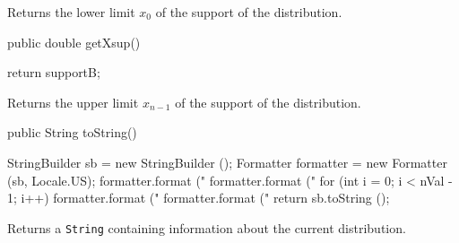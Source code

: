 \begin{tabb} Returns the lower limit $x_0$ of the support of the distribution.
\end{tabb}
\begin{htmlonly}
\end{htmlonly}
\begin{code}

   public double getXsup()\begin{hide} {
      return supportB;
   }\end{hide}
\end{code}
\begin{tabb} Returns the upper limit $x_{n-1}$ of the support of the distribution.
\end{tabb}
\begin{htmlonly}
\end{htmlonly}
\begin{code}

   public String toString()\begin{hide} {
      StringBuilder sb = new StringBuilder ();
      Formatter formatter = new Formatter (sb, Locale.US);
      formatter.format ("%
      formatter.format ("%
      for (int i = 0; i < nVal - 1; i++)
         formatter.format ("%
      formatter.format ("%
      return sb.toString ();
   }\end{hide}
\end{code}
\begin{tabb}
   Returns a \texttt{String} containing information about the current distribution.
\end{tabb}
\begin{code}\begin{hide}
}\end{hide}
\end{code}
